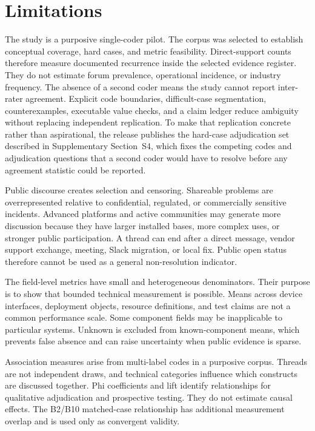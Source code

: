\section{Limitations}
\label{sec:limitations}

The study is a purposive single-coder pilot. The corpus was selected to establish conceptual coverage, hard cases, and metric feasibility. Direct-support counts therefore measure documented recurrence inside the selected evidence register. They do not estimate forum prevalence, operational incidence, or industry frequency. The absence of a second coder means the study cannot report inter-rater agreement. Explicit code boundaries, difficult-case segmentation, counterexamples, executable value checks, and a claim ledger reduce ambiguity without replacing independent replication. To make that replication concrete rather than aspirational, the release publishes the hard-case adjudication set described in Supplementary Section~S4, which fixes the competing codes and adjudication questions that a second coder would have to resolve before any agreement statistic could be reported.

Public discourse creates selection and censoring. Shareable problems are overrepresented relative to confidential, regulated, or commercially sensitive incidents. Advanced platforms and active communities may generate more discussion because they have larger installed bases, more complex uses, or stronger public participation. A thread can end after a direct message, vendor support exchange, meeting, Slack migration, or local fix. Public open status therefore cannot be used as a general non-resolution indicator.

The field-level metrics have small and heterogeneous denominators. Their purpose is to show that bounded technical measurement is possible. Means across device interfaces, deployment objects, resource definitions, and test claims are not a common performance scale. Some component fields may be inapplicable to particular systems. Unknown is excluded from known-component means, which prevents false absence and can raise uncertainty when public evidence is sparse.

Association measures arise from multi-label codes in a purposive corpus. Threads are not independent draws, and technical categories influence which constructs are discussed together. Phi coefficients and lift identify relationships for qualitative adjudication and prospective testing. They do not estimate causal effects. The B2/B10 matched-case relationship has additional measurement overlap and is used only as convergent validity.

